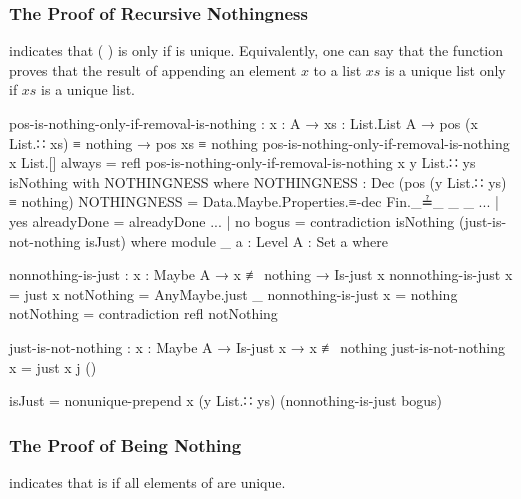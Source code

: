 \documentclass{report}
\begin{document}
\subsubsection{The Proof of Recursive Nothingness}
 indicates that  \AgdaSymbol(  \AgdaSymbol) is  only if  is unique.  Equivalently, one can say that the function proves that the result of appending an element \(x\) to a list \(xs\) is a unique list only if \(xs\) is a unique list.

\begin{code}
    pos-is-nothing-only-if-removal-is-nothing :
      {x : A} →
      {xs : List.List A} →
      pos (x List.∷ xs) ≡ nothing →
      pos xs ≡ nothing
    pos-is-nothing-only-if-removal-is-nothing {x} {List.[]} always = refl
    pos-is-nothing-only-if-removal-is-nothing {x} {y List.∷ ys} isNothing with NOTHINGNESS
      where
      NOTHINGNESS : Dec (pos (y List.∷ ys) ≡ nothing)
      NOTHINGNESS = Data.Maybe.Properties.≡-dec Fin._≟_ _ _
    ... | yes alreadyDone = alreadyDone
    ... | no bogus = contradiction isNothing (just-is-not-nothing isJust)
      where
      module _
        {a : Level}
        {A : Set a} where

        nonnothing-is-just : {x : Maybe A} → x ≢ nothing → Is-just x
        nonnothing-is-just {x = just x} notNothing = AnyMaybe.just _
        nonnothing-is-just {x = nothing} notNothing = contradiction refl notNothing

        just-is-not-nothing : {x : Maybe A} → Is-just x → x ≢ nothing
        just-is-not-nothing {x = just x} j ()

      isJust = nonunique-prepend x (y List.∷ ys) (nonnothing-is-just bogus)
\end{code}

\subsubsection{The Proof of Being Nothing}
 indicates that   is  if all elements of  are unique.
\end{document}
